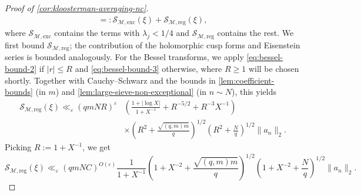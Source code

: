 \documentclass[reqno,11pt]{amsart}
\theoremstyle{remark}
\numberwithin{equation}{section}
\newcommand{\mM}{\mathcal{M}}
\newcommand{\mS}{\mathcal{S}}
\newcommand{\eps}{\varepsilon}
\begin{document}
\begin{proof}[Proof of \cref{cor:kloosterman-averaging-nc}]
\[\begin{aligned}
    =:
    \mS_{\mM,\text{exc}}(\xi) + \mS_{\mM,\text{reg}}(\xi),
\end{aligned}
\]
where $\mS_{\mM,\text{exc}}$ contains the terms with $\lambda_j < 1/4$ and $\mS_{\mM,\text{reg}}$ contains the rest.
We first bound $\mS_{\mM,\text{reg}}$; the contribution of the holomorphic cusp forms and Eisenstein series is bounded analogously. For the Bessel transforms, we apply \cref{eq:bessel-bound-2} if $|r| \le R$ and \cref{eq:bessel-bound-3} otherwise, where $R \ge 1$ will be chosen shortly. Together with Cauchy--Schwarz and the bounds in \cref{lem:coefficient-bounds} (in $m$) and \cref{lem:large-sieve-non-exceptional} (in $n \sim N$), this yields
\[
\begin{aligned}
    \mS_{\mM,\text{reg}}(\xi)
    \ll_\eps (qmNR)^\eps 
    &\left(\frac{1 + |\log X|}{1 + X^{-1}} + R^{-5/2} + R^{-3} X^{-1}\right) 
    \\
    &\times \left(R^2 + \frac{\sqrt{(q,m)m}}{q}\right)^{1/2} \left(R^2 + \frac{N}{q}\right)^{1/2} \|a_n\|_2.
\end{aligned}
\]
Picking $R := 1 + X^{-1}$, we get
\begin{equation} \label{eq:S-bound-regular}
    \mS_{\mM,\text{reg}}(\xi)
    \ll_\eps (qmNC)^{O(\eps)} \frac{1}{1 + X^{-1}}
    \left(1 + X^{-2} + \frac{\sqrt{(q,m)m}}{q}\right)^{1/2} \left(1 + X^{-2} + \frac{N}{q}\right)^{1/2} \|a_n\|_2.
\end{equation}


\end{proof}
\end{document}
